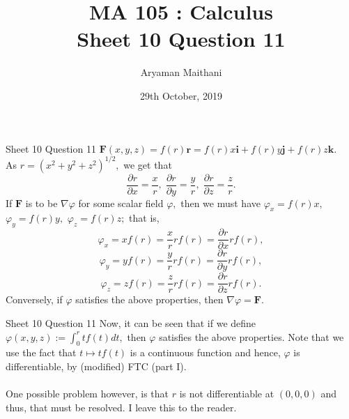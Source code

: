 \documentclass[handout, aspectratio=169]{beamer}
\title{MA 105 : Calculus\\ Sheet 10 Question 11}  %
\author{Aryaman Maithani}
\date[29-10-2019]{29th October, 2019}               %
\institute[IITB]{IIT Bombay}
\begin{document}
\begin{frame}{Sheet 10 Question 11}                            %
	$\mathbf{F}(x, y, z) = f(r)\mathbf{r} = f(r)x \mathbf{i} + f(r)y \mathbf{j} + f(r)z \mathbf{k}.$\\
	As $r = (x^2 + y^2 + z^2)^{1/2},$ we get that
	\[\frac{\partial r}{\partial x} = \frac{x}{r},\;\frac{\partial r}{\partial y} = \frac{y}{r},\;\frac{\partial r}{\partial z} = \frac{z}{r}.\]
	If $\mathbf{F}$ is to be $\nabla\varphi$ for some scalar field $\varphi,$ then we must have $\varphi_x = f(r)x,$ $\varphi_y = f(r)y,$ $\varphi_z = f(r)z;$ that is, 
	\[\varphi_x = xf(r) = \frac{x}{r}rf(r) = \frac{\partial r}{\partial x}rf(r),\] 
	\[\varphi_y = yf(r) = \frac{y}{r}rf(r) = \frac{\partial r}{\partial y}rf(r),\] 
	\[\varphi_z = zf(r) = \frac{z}{r}rf(r) = \frac{\partial r}{\partial z}rf(r).\]
	Conversely, if $\varphi$ satisfies the above properties, then $\nabla \varphi = \mathbf{F}.$\\
\end{frame}
\begin{frame}{Sheet 10 Question 11} 
	Now, it can be seen that if we define $\varphi(x, y, z) := \displaystyle\int_{0}^{r} tf(t) dt,$ then $\varphi$ satisfies the above properties. Note that we use the fact that $t \mapsto tf(t)$ is a continuous function and hence, $\varphi$ is differentiable, by (modified) FTC (part I).\\~\\
	One possible problem however, is that $r$ is not differentiable at $(0, 0, 0)$ and thus, that must be resolved. I leave this to the reader.
\end{frame}
\end{document}
